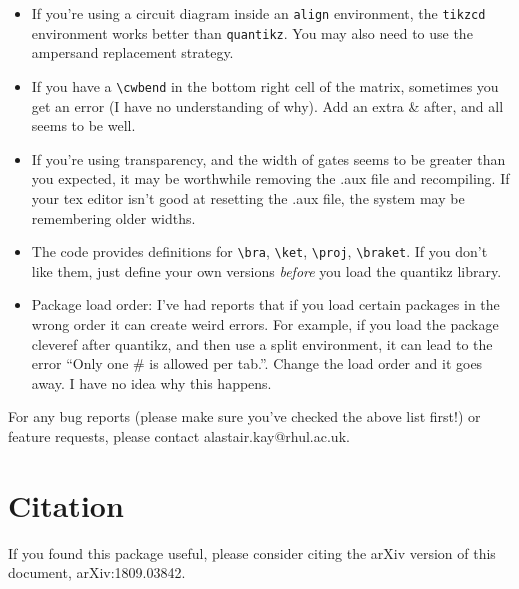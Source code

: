 \documentclass[aps,pra,10pt,nofootinbib]{revtex4}
\begin{document}
\begin{itemize}
\begin{Code}
\begin{lstlisting}
\lstick{$\ket{0}$} \& \qw \& \targ{} \& \gate{U_2} \& \qw
\end{quantikz}
\end{lstlisting}
\end{Code}
Beamer is particularly annoying with doing this. It probably helps to issue a global command
\begin{lstlisting}
\tikzcdset{
	every matrix/.style={ampersand replacement=\&}
}
\end{lstlisting}
somewhere in your document preamble. The tikzcd manual suggests another possible strategy, but I haven't had much success with it.
\item If you're using a circuit diagram inside an \texttt{align} environment, the \texttt{tikzcd} environment works better than \texttt{quantikz}. You may also need to use the ampersand replacement strategy.
\item If you have a \verb!\cwbend! in the bottom right cell of the matrix, sometimes you get an error (I have no understanding of why). Add an extra \& after, and all seems to be well.
\item If you're using transparency, and the width of gates seems to be greater than you expected, it may be worthwhile removing the .aux file and recompiling. If your tex editor isn't good at resetting the .aux file, the system may be remembering older widths.
\item The code provides definitions for \verb!\bra!, \verb!\ket!, \verb!\proj!, \verb!\braket!. If you don't like them, just define your own versions \emph{before} you load the quantikz library.
\item Package load order: I've had reports that if you load certain packages in the wrong order it can create weird errors. For example, if you load the package cleveref after quantikz, and then use a split environment, it can lead to the error ``Only one \# is allowed per tab.''. Change the load order and it goes away. I have no idea why this happens.
\end{itemize}

For any bug reports (please make sure you've checked the above list first!) or feature requests, please contact alastair.kay@rhul.ac.uk.

\section{Citation}

If you found this package useful, please consider citing the arXiv version of this document, arXiv:1809.03842.
\end{document}
